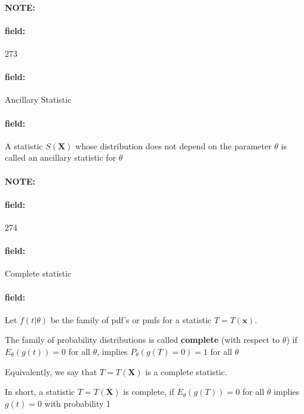 \documentclass[12pt]{article}
\newenvironment{note}{\paragraph{NOTE:}}{}
\newenvironment{field}{\paragraph{field:}}{}
\begin{document}
\begin{note} \begin{field} \tiny 273 \end{field}
  \begin{field}
    Ancillary Statistic
  \end{field}
  \begin{field}
    A statistic $S(\mathbf{X})$ whose distribution does not depend on the parameter $\theta$ is called an ancillary statistic for $\theta$
  \end{field}
\end{note}



\begin{note} \begin{field} \tiny 274 \end{field}
  \begin{field}
    Complete statistic
  \end{field}
  \begin{field}
    Let $f(t|\theta)$ be the family of pdf's or pmfs for a statistic $T= T(\mathbf{x})$.

    The family of probability distributions is called \textbf{complete} (with respect to $\theta$) if $E_\theta(g(t)) = 0$ for all $\theta$, implies $P_\theta(g(T) = 0) = 1$ for all $\theta$

    Equivalently, we say that $T = T(\mathbf{X})$ is a complete statistic.

    In short, a statistic $T = T(\mathbf{X})$ is complete, if $E_\theta(g(T)) = 0$ for all $\theta$ implies $g(t) = 0$ with probability 1
  \end{field}
\end{note}
\end{document}
